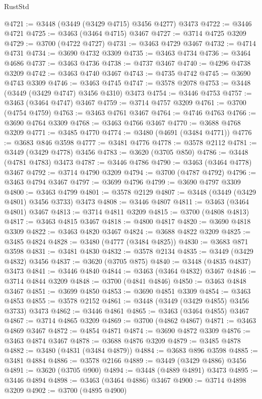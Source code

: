 \begin{lexlean}{RustStd}
\begin{coremodule}
{{{{{{{{{{{{{{{{{{{@4721 := @3448 (@3449 (@3429 @4715) @3456 @4277) @3473
@4722 := @3446 @4721
@4725 := @3463 (@3464 @4715) @3467
@4727 := @3714 @4725 @3209
@4729 := @3700 (@4722 @4727)
@4731 := @3463 @4729 @3467
@4732 := @4714 @4731
@4734 := @3690 @4732 @3309
@4735 := @3463 @4734
@4736 := @3464 @4686
@4737 := @3463 @4736
@4738 := @4737 @3467
@4740 := @4296 @4738 @3209
@4742 := @3463 @4740 @3467
@4743 := @4735 @4742
@4745 := @3690 @4743 @3309
@4746 := @3463 @4745
@4747 := @3578 @2078
@4753 := @3448 (@3449 (@3429 @4747) @3456 @4310) @3473
@4754 := @3446 @4753
@4757 := @3463 (@3464 @4747) @3467
@4759 := @3714 @4757 @3209
@4761 := @3700 (@4754 @4759)
@4763 := @3463 @4761 @3467
@4764 := @4746 @4763
@4766 := @3690 @4764 @3309
@4768 := @3463 @4766 @3467
@4770 := @3688 @4768 @3209
@4771 := @3485 @4770
@4774 := @3480 (@4691 (@3484 @4771))
@4776 := @3683 @846 @3598
@4777 := @3481 @4776
@4778 := @3578 @2112
@4781 := @3449 (@3429 @4778) @3456
@4783 := @3620 (@3705 @850)
@4786 := @3448 (@4781 @4783) @3473
@4787 := @3446 @4786
@4790 := @3463 (@3464 @4778) @3467
@4792 := @3714 @4790 @3209
@4794 := @3700 (@4787 @4792)
@4796 := @3463 @4794 @3467
@4797 := @3699 @4796
@4799 := @3690 @4797 @3309
@4800 := @3463 @4799
@4801 := @3578 @2129
@4807 := @3448 (@3449 (@3429 @4801) @3456 @3733) @3473
@4808 := @3446 @4807
@4811 := @3463 (@3464 @4801) @3467
@4813 := @3714 @4811 @3209
@4815 := @3700 (@4808 @4813)
@4817 := @3463 @4815 @3467
@4818 := @4800 @4817
@4820 := @3690 @4818 @3309
@4822 := @3463 @4820 @3467
@4824 := @3688 @4822 @3209
@4825 := @3485 @4824
@4828 := @3480 (@4777 (@3484 @4825))
@4830 := @3683 @871 @3598
@4831 := @3481 @4830
@4832 := @3578 @2134
@4835 := @3449 (@3429 @4832) @3456
@4837 := @3620 (@3705 @875)
@4840 := @3448 (@4835 @4837) @3473
@4841 := @3446 @4840
@4844 := @3463 (@3464 @4832) @3467
@4846 := @3714 @4844 @3209
@4848 := @3700 (@4841 @4846)
@4850 := @3463 @4848 @3467
@4851 := @3699 @4850
@4853 := @3690 @4851 @3309
@4854 := @3463 @4853
@4855 := @3578 @2152
@4861 := @3448 (@3449 (@3429 @4855) @3456 @3733) @3473
@4862 := @3446 @4861
@4865 := @3463 (@3464 @4855) @3467
@4867 := @3714 @4865 @3209
@4869 := @3700 (@4862 @4867)
@4871 := @3463 @4869 @3467
@4872 := @4854 @4871
@4874 := @3690 @4872 @3309
@4876 := @3463 @4874 @3467
@4878 := @3688 @4876 @3209
@4879 := @3485 @4878
@4882 := @3480 (@4831 (@3484 @4879))
@4884 := @3683 @896 @3598
@4885 := @3481 @4884
@4886 := @3578 @2166
@4889 := @3449 (@3429 @4886) @3456
@4891 := @3620 (@3705 @900)
@4894 := @3448 (@4889 @4891) @3473
@4895 := @3446 @4894
@4898 := @3463 (@3464 @4886) @3467
@4900 := @3714 @4898 @3209
@4902 := @3700 (@4895 @4900)
}}}}}}}}}}}}}}}}}}}
\end{coremodule}
\end{lexlean}
